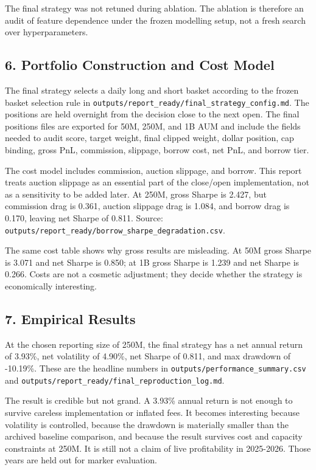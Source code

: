 \documentclass[
]{article}
\begin{document}
The final strategy was not retuned during ablation. The ablation is
therefore an audit of feature dependence under the frozen modelling
setup, not a fresh search over hyperparameters.

\hypertarget{6-portfolio-construction-and-cost-model}{%
\subsection{6. Portfolio Construction and Cost
Model}\label{6-portfolio-construction-and-cost-model}}

The final strategy selects a daily long and short basket according to
the frozen basket selection rule in
\texttt{outputs/report\_ready/final\_strategy\_config.md}. The positions
are held overnight from the decision close to the next open. The final
positions files are exported for 50M, 250M, and 1B AUM and include the
fields needed to audit score, target weight, final clipped weight,
dollar position, cap binding, gross PnL, commission, slippage, borrow
cost, net PnL, and borrow tier.

The cost model includes commission, auction slippage, and borrow. This
report treats auction slippage as an essential part of the close/open
implementation, not as a sensitivity to be added later. At 250M, gross
Sharpe is 2.427, but commission drag is 0.361, auction slippage drag is
1.084, and borrow drag is 0.170, leaving net Sharpe of 0.811. Source:
\texttt{outputs/report\_ready/borrow\_sharpe\_degradation.csv}.

The same cost table shows why gross results are misleading. At 50M gross
Sharpe is 3.071 and net Sharpe is 0.850; at 1B gross Sharpe is 1.239 and
net Sharpe is 0.266. Costs are not a cosmetic adjustment; they decide
whether the strategy is economically interesting.

\hypertarget{7-empirical-results}{%
\subsection{7. Empirical Results}\label{7-empirical-results}}

At the chosen reporting size of 250M, the final strategy has a net
annual return of 3.93\%, net volatility of 4.90\%, net Sharpe of 0.811,
and max drawdown of -10.19\%. These are the headline numbers in
\texttt{outputs/performance\_summary.csv} and
\texttt{outputs/report\_ready/final\_reproduction\_log.md}.

The result is credible but not grand. A 3.93\% annual return is not
enough to survive careless implementation or inflated fees. It becomes
interesting because volatility is controlled, because the drawdown is
materially smaller than the archived baseline comparison, and because
the result survives cost and capacity constraints at 250M. It is still
not a claim of live profitability in 2025-2026. Those years are held out
for marker evaluation.
\end{document}
